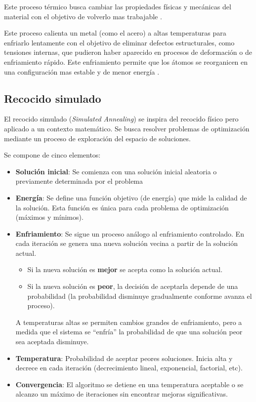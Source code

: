 \documentclass[12pt,twoside]{article}
\begin{document}
	Este proceso térmico busca cambiar las propiedades físicas y mecánicas del material con el objetivo de volverlo mas trabajable \cite{recocido}.

	Este proceso calienta un metal (como el acero) a altas temperaturas para enfriarlo lentamente con el objetivo de eliminar defectos estructurales, como tensiones internas, que pudieron haber aparecido en procesos de deformación o de enfriamiento rápido. Este enfriamiento permite que los átomos se reorganicen en una configuración mas estable y de menor energía \cite{recocido_2}.
	
	\subsection{Recocido simulado}

	El recocido simulado (\textit{Simulated Annealing}) se inspira del recocido físico pero aplicado a un contexto matemático. Se busca resolver problemas de optimización mediante un proceso de exploración del espacio de soluciones.
	
	Se compone de cinco elementos:
	\begin{itemize}
		\item \textbf{Solución inicial}: Se comienza con una solución inicial aleatoria o previamente determinada por el problema
		
		\item \textbf{Energía}: Se define una función objetivo (de energía) que mide la calidad de la solución. Esta función es única para cada problema de optimización (máximos y mínimos).
		
		\item \textbf{Enfriamiento}: Se sigue un proceso análogo al enfriamiento controlado. En cada iteración se genera una nueva solución vecina a partir de la solución actual. 
		
		\begin{itemize}
			\item Si la nueva solución es \textbf{mejor} se acepta como la solución actual.
			\item Si la nueva solución es \textbf{peor}, la decisión de aceptarla depende de una probabilidad (la probabilidad disminuye gradualmente conforme avanza el proceso).
		\end{itemize}
		
		A temperaturas altas se permiten cambios grandes de enfriamiento, pero a medida que el sistema se ``enfría'' la probabilidad de que una solución peor sea aceptada disminuye.
		
		\item \textbf{Temperatura}: Probabilidad de aceptar peores soluciones. Inicia alta y decrece en cada iteración (decrecimiento lineal, exponencial, factorial, etc).
		
		\item \textbf{Convergencia}: El algoritmo se detiene en una temperatura aceptable o se alcanzo un máximo de iteraciones sin encontrar mejoras significativas.
	\end{itemize}
\end{document}
